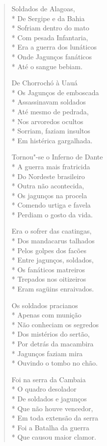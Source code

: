 \begin{verse}
Soldados de Alagoas,\\*
De Sergipe e da Bahia\\*
Sofriam dentro do mato\\*
Com pesada Infantaria,\\*
Era a guerra dos lunáticos\\*
Onde Jagunços fanáticos\\*
Até o sangue bebiam.

De Chorrochó à Uauá\\*
Os Jagunços de emboscada\\*
Assassinavam soldados\\*
Até mesmo de pedrada,\\*
Nos arvoredos ocultos\\*
Sorriam, faziam insultos\\*
Em histérica gargalhada.

Tornou"-se o Inferno de Dante\\*
A guerra mais fratricida\\*
Do Nordeste brasileiro\\*
Outra não acontecida,\\*
Os jagunços na procela\\*
Comendo urtiga e favela\\*
Perdiam o gosto da vida.

Era o sofrer das caatingas,\\*
Dos mandacarus talhados\\*
Pelos golpes dos facões\\*
Entre jagunços, soldados,\\*
Os fanáticos matreiros\\*
Trepados nos oitizeiros\\*
Eram sagüins enraivados.

Os soldados pracianos\\*
Apenas com munição\\*
Não conheciam os segredos\\*
Dos mistérios do sertão,\\*
Por detrás da macambira\\*
Jagunços faziam mira\\*
Ouvindo o tombo no chão.

Foi na serra da Cambaia\\*
O quadro desolador\\*
De soldados e jagunços\\*
Que não houve vencedor,\\*
Em toda extensão da serra\\*
Foi a Batalha da guerra\\*
Que causou maior clamor.


\end{verse}
